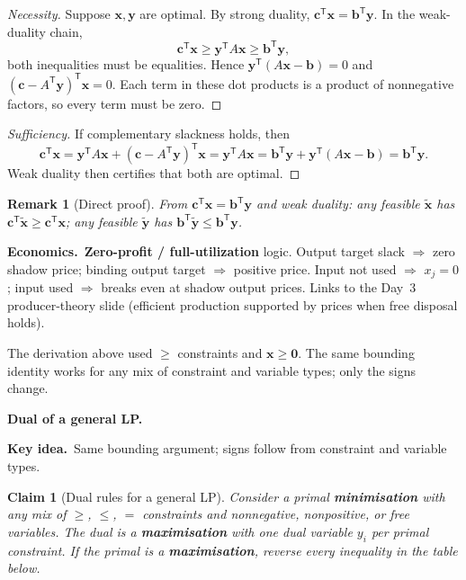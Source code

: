 \documentclass[11pt,a4paper]{article}
\newtheorem{claim}{Claim}
\newtheorem{remark}[theorem]{Remark}
\newcommand{\keyidea}[1]{\medskip\noindent\textbf{Key idea.}\ #1\medskip}
\newcommand{\econ}[1]{\medskip\noindent\textbf{Economics.}\ #1\medskip}
\begin{document}
\begin{proof}[Necessity]
Suppose $\mathbf{x},\mathbf{y}$ are optimal.
By strong duality, $\mathbf{c}^{\mathsf T}\mathbf{x}=\mathbf{b}^{\mathsf T}\mathbf{y}$.
In the weak-duality chain,
\[
  \mathbf{c}^{\mathsf T}\mathbf{x}
  \ge \mathbf{y}^{\mathsf T}A\mathbf{x}
  \ge \mathbf{b}^{\mathsf T}\mathbf{y},
\]
both inequalities must be equalities.
Hence $\mathbf{y}^{\mathsf T}(A\mathbf{x}-\mathbf{b})=0$ and $(\mathbf{c}-A^{\mathsf T}\mathbf{y})^{\mathsf T}\mathbf{x}=0$.
Each term in these dot products is a product of nonnegative factors, so every term must be zero.
\end{proof}

\begin{proof}[Sufficiency]
If complementary slackness holds, then
\[
  \mathbf{c}^{\mathsf T}\mathbf{x}
  = \mathbf{y}^{\mathsf T}A\mathbf{x} + (\mathbf{c}-A^{\mathsf T}\mathbf{y})^{\mathsf T}\mathbf{x}
  = \mathbf{y}^{\mathsf T}A\mathbf{x}
  = \mathbf{b}^{\mathsf T}\mathbf{y} + \mathbf{y}^{\mathsf T}(A\mathbf{x}-\mathbf{b})
  = \mathbf{b}^{\mathsf T}\mathbf{y}.
\]
Weak duality then certifies that both are optimal.
\end{proof}

\begin{remark}[Direct proof]
From $\mathbf{c}^{\mathsf T}\mathbf{x}=\mathbf{b}^{\mathsf T}\mathbf{y}$ and weak duality:
any feasible $\tilde{\mathbf{x}}$ has $\mathbf{c}^{\mathsf T}\tilde{\mathbf{x}}\ge\mathbf{c}^{\mathsf T}\mathbf{x}$;
any feasible $\tilde{\mathbf{y}}$ has $\mathbf{b}^{\mathsf T}\tilde{\mathbf{y}}\le\mathbf{b}^{\mathsf T}\mathbf{y}$.
\end{remark}

\econ{\textbf{Zero-profit / full-utilization} logic.
Output target slack $\Rightarrow$ zero shadow price; binding output target $\Rightarrow$ positive price.
Input not used $\Rightarrow$ $x_j=0$; input used $\Rightarrow$ breaks even at shadow output prices.
Links to the Day~3 producer-theory slide (efficient production supported by prices when free disposal holds).}

The derivation above used $\ge$ constraints and $\mathbf{x}\ge\mathbf{0}$.
The same bounding identity works for any mix of constraint and variable types; only the signs change.

\textbf{Dual of a general LP.}

\keyidea{Same bounding argument; signs follow from constraint and variable types.}

\begin{claim}[Dual rules for a general LP]
Consider a primal \textbf{minimisation} with any mix of $\ge$, $\le$, $=$ constraints and
nonnegative, nonpositive, or free variables.
The dual is a \textbf{maximisation} with one dual variable $y_i$ per primal constraint.
If the primal is a \textbf{maximisation}, reverse every inequality in the table below.
\end{claim}
\end{document}
